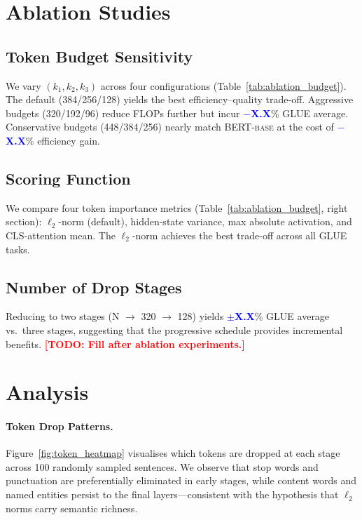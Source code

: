 \documentclass[11pt]{article}
\newcommand{\bertbase}{\textsc{BERT-base}}       %
\newcommand{\TODO}[1]{\textcolor{red}{\textbf{[TODO: #1]}}}
\newcommand{\RESULT}[1]{\textcolor{blue}{\textbf{#1}}}  %
\begin{document}
\section{Ablation Studies}
\label{sec:ablation}

\subsection{Token Budget Sensitivity}


We vary $(k_1, k_2, k_3)$ across four configurations
(Table~\ref{tab:ablation_budget}).
The default (384/256/128) yields the best efficiency--quality trade-off.
Aggressive budgets (320/192/96) reduce FLOPs further but incur
\RESULT{$-$X.X}\% GLUE average.
Conservative budgets (448/384/256) nearly match \bertbase{} at the cost of
\RESULT{$-$X.X}\% efficiency gain.

\subsection{Scoring Function}

We compare four token importance metrics
(Table~\ref{tab:ablation_budget}, right section):
$\ell_2$-norm (default), hidden-state variance, max absolute activation,
and \textsc{CLS}-attention mean.
The $\ell_2$-norm achieves the best trade-off across all GLUE tasks.

\subsection{Number of Drop Stages}

Reducing to two stages (N $\to$ 320 $\to$ 128) yields
\RESULT{$\pm$X.X}\% GLUE average vs.\ three stages,
suggesting that the progressive schedule provides incremental benefits.
\TODO{Fill after ablation experiments.}

\section{Analysis}
\label{sec:analysis}

\paragraph{Token Drop Patterns.}
Figure~\ref{fig:token_heatmap} visualises which tokens are dropped at each
stage across 100 randomly sampled sentences.
We observe that stop words and punctuation are preferentially eliminated in
early stages, while content words and named entities persist to the final
layers—consistent with the hypothesis that $\ell_2$ norms carry semantic
richness.
\end{document}
